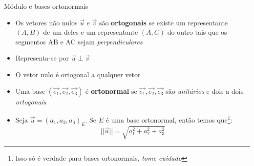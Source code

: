 \begin{frame}{Módulo e bases ortonormais}
    \begin{itemize}
        \item Os vetores não nulos \(\vec{u}\) e \(\vec{v}\) são \textbf{ortogonais} se existe um representante
            \((A,B)\) de um deles e um representante \((A,C)\) do outro tais que os segmentos AB e AC sejam
            \textit{perpendiculares}
        \item Representa-se por \(\vec{u} \perp \vec{v}\)
        \item O vetor nulo é ortogonal a qualquer vetor
        \item Uma base \((\vec{e_1},\vec{e_2},\vec{e_3})\) é \textbf{ortonormal} se \(\vec{e_1},\vec{e_2},\vec{e_3}\)
            são \textit{unitários} e dois a dois \textit{ortogonais}
        \item Seja \(\vec{u}=(a_1,a_2,a_3)_E\). Se \(E\) é uma base ortonormal, então temos
            que\footnote{Isso só é verdade para bases ortonormais, \textit{tome cuidado}}:
            \[
                ||\vec{u}||=\sqrt{a_1^2+a_2^2+a_3^2}
            \]

    \end{itemize}
\end{frame}

